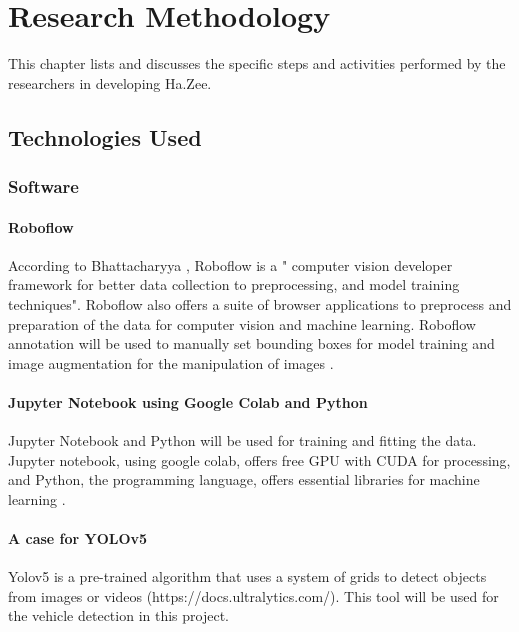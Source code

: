 \chapter{Research Methodology}
This chapter lists and discusses the specific steps and activities performed by the researchers in developing Ha.Zee.

\section{Technologies Used}

\subsection{Software}

\subsubsection{Roboflow}
According to Bhattacharyya \citeyear{Bhattacharyya_2020}, Roboflow is a " computer vision developer framework for better data collection to preprocessing, and model training techniques". Roboflow also offers a suite  of browser applications to preprocess and preparation of the data for computer vision and machine learning. Roboflow annotation will be used  to manually set bounding boxes for model training and image augmentation for the manipulation of images \cite{roboflow}.

\subsubsection{Jupyter Notebook using Google Colab and Python}
Jupyter Notebook and Python will be used for training and fitting the data. Jupyter notebook, using google colab,  offers free GPU with CUDA for processing, and Python, the programming language, offers essential libraries for machine learning \cite{googlecolab}.

\subsubsection{A case  for YOLOv5}
Yolov5 is a pre-trained algorithm that uses a system of grids to detect objects from images or videos (https://docs.ultralytics.com/). This tool will be used for the vehicle detection in this project. 

